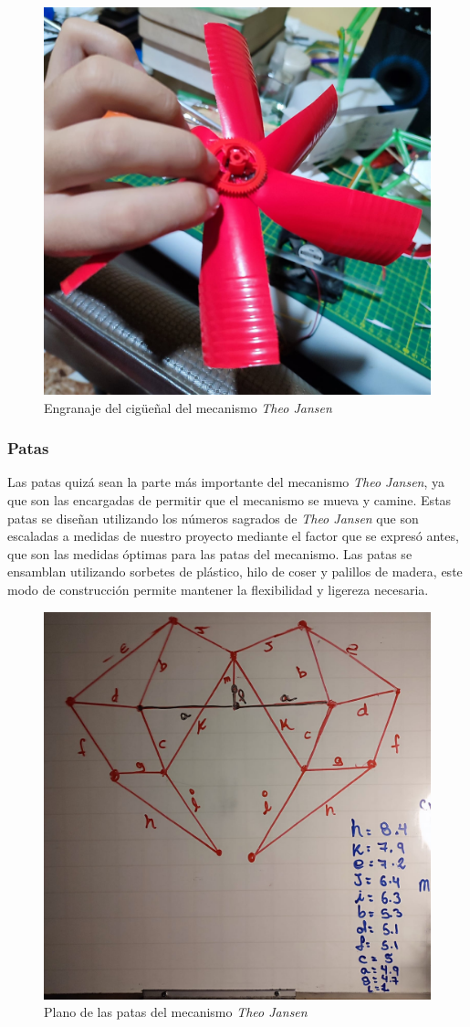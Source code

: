 \begin{multicols}{2}
\begin{figure}[H]
  \centering
  \includegraphics[width=0.6\linewidth]{./assets/cigueal2.jpeg}
  \caption{Engranaje del cigüeñal del mecanismo \textit{Theo Jansen}}
  \label{fig:engranaje_cigueñal}
\end{figure}

\subsubsection{Patas}
Las patas quizá sean la parte más importante del mecanismo \textit{Theo Jansen}, ya que son las encargadas de permitir que el mecanismo se mueva y camine. Estas patas se diseñan utilizando los números sagrados de \textit{Theo Jansen} que son escaladas a medidas de nuestro proyecto mediante el factor que se expresó antes, que son las medidas óptimas para las patas del mecanismo. Las patas se ensamblan utilizando sorbetes de plástico, hilo de coser y palillos de madera, este modo de construcción permite mantener la flexibilidad y ligereza necesaria.

\begin{figure}[H]
  \centering
  \includegraphics[width=0.6\linewidth]{./assets/plano.jpeg}
  \caption{Plano de las patas del mecanismo \textit{Theo Jansen}}
  \label{fig:patas}
\end{figure}


\end{multicols}
